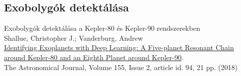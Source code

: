 \subsection{Exobolygók detektálása}

\begin{frame}{}
    \centering
    \Huge{Exobolygók detektálása a Kepler-80 és Kepler-90 rendszerekben}\\
    \vspace*{1cm}
    \large{Shallue, Christopher J.; Vanderburg, Andrew \\ \href{https://iopscience.iop.org/article/10.3847/1538-3881/aa9e09/pdf}{Identifying Exoplanets with Deep Learning: A Five-planet Resonant Chain around Kepler-80 and an Eighth Planet around Kepler-90}. \\ The Astronomical Journal, Volume 155, Issue 2, article id. 94, 21 pp. (2018)}
\end{frame}

